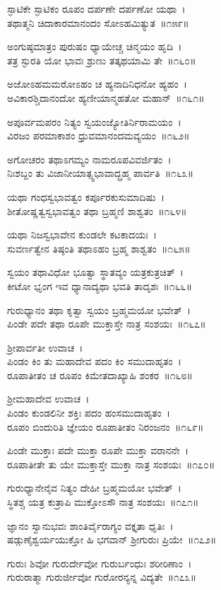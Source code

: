 ಸ್ಫಾಟಿಕೇ ಸ್ಫಾಟಿಕಂ ರೂಪಂ ದರ್ಪಣೇ ದರ್ಪಣೋ ಯಥಾ~।\\
ತಥಾತ್ಮನಿ ಚಿದಾಕಾರಮಾನಂದಂ ಸೋಽಹಮಿತ್ಯುತ~॥೧೫೯॥

ಅಂಗುಷ್ಠಮಾತ್ರಂ ಪುರುಷಂ ಧ್ಯಾಯೇಚ್ಚ ಚಿನ್ಮಯಂ ಹೃದಿ~।\\
ತತ್ರ ಸ್ಫುರತಿ ಯೋ ಭಾವಃ ಶ್ರುಣು ತತ್ಕಥಯಾಮಿ ತೇ~॥೧೬೦॥

ಅಜೋಽಹಮಮರೋಽಹಂ ಚ ಹ್ಯನಾದಿನಿಧನೋ ಹ್ಯಹಂ~।\\
ಅವಿಕಾರಶ್ಚಿದಾನಂದೋ ಹ್ಯಣೀಯಾನ್ಮಹತೋ ಮಹಾನ್~॥೧೬೧॥

ಅಪೂರ್ವಮಪರಂ ನಿತ್ಯಂ ಸ್ವಯಂಜ್ಯೋತಿರ್ನಿರಾಮಯಂ~।\\
ವಿರಜಂ ಪರಮಾಕಾಶಂ ಧ್ರುವಮಾನಂದಮವ್ಯಯಂ~॥೧೬೨॥

ಅಗೋಚರಂ ತಥಾಽಗಮ್ಯಂ ನಾಮರೂಪವಿವರ್ಜಿತಂ~।\\
ನಿಃಶಬ್ದಂ ತು ವಿಜಾನೀಯಾತ್ಸ್ವಭಾವಾದ್ಬ್ರಹ್ಮ ಪಾರ್ವತಿ~॥೧೬೩॥

ಯಥಾ ಗಂಧಸ್ವಭಾವತ್ವಂ ಕರ್ಪೂರಕುಸುಮಾದಿಷು~।\\
ಶೀತೋಷ್ಣತ್ವಸ್ವಭಾವತ್ವಂ ತಥಾ ಬ್ರಹ್ಮಣಿ ಶಾಶ್ವತಂ~॥೧೬೪॥

ಯಥಾ ನಿಜಸ್ವಭಾವೇನ ಕುಂಡಲೇ ಕಟಕಾದಯಃ~।\\
ಸುವರ್ಣತ್ವೇನ ತಿಷ್ಠಂತಿ ತಥಾಽಹಂ ಬ್ರಹ್ಮ ಶಾಶ್ವತಂ~॥೧೬೫॥

ಸ್ವಯಂ ತಥಾವಿಧೋ ಭೂತ್ವಾ ಸ್ಥಾತವ್ಯಂ ಯತ್ರಕುತ್ರಚಿತ್~।\\
ಕೀಟೋ ಭೃಂಗ ಇವ ಧ್ಯಾನಾದ್ಯಥಾ ಭವತಿ ತಾದೃಶಃ~॥೧೬೬॥

ಗುರುಧ್ಯಾನಂ ತಥಾ ಕೃತ್ವಾ ಸ್ವಯಂ ಬ್ರಹ್ಮಮಯೋ ಭವೇತ್~।\\
ಪಿಂಡೇ ಪದೇ ತಥಾ ರೂಪೇ ಮುಕ್ತಾಸ್ತೇ ನಾತ್ರ ಸಂಶಯಃ~॥೧೬೭॥

ಶ್ರೀಪಾರ್ವತೀ ಉವಾಚ~।\\
ಪಿಂಡಂ ಕಿಂ ತು ಮಹಾದೇವ ಪದಂ ಕಿಂ ಸಮುದಾಹೃತಂ~।\\
ರೂಪಾತೀತಂ ಚ ರೂಪಂ ಕಿಮೇತದಾಖ್ಯಾಹಿ ಶಂಕರ~॥೧೬೮॥

ಶ್ರೀಮಹಾದೇವ ಉವಾಚ~।\\
ಪಿಂಡಂ ಕುಂಡಲಿನೀ ಶಕ್ತಿಃ ಪದಂ ಹಂಸಮುದಾಹೃತಂ~।\\
ರೂಪಂ ಬಿಂದುರಿತಿ ಜ್ಞೇಯಂ ರೂಪಾತೀತಂ ನಿರಂಜನಂ~॥೧೬೯॥

ಪಿಂಡೇ ಮುಕ್ತಾಃ ಪದೇ ಮುಕ್ತಾ ರೂಪೇ ಮುಕ್ತಾ ವರಾನನೇ~।\\
ರೂಪಾತೀತೇ ತು ಯೇ ಮುಕ್ತಾಸ್ತೇ ಮುಕ್ತಾ ನಾತ್ರ ಸಂಶಯಃ~॥೧೭೦॥

ಗುರುಧ್ಯಾನೇನೈವ ನಿತ್ಯಂ ದೇಹೀ ಬ್ರಹ್ಮಮಯೋ ಭವೇತ್~।\\
ಸ್ಥಿತಶ್ಚ ಯತ್ರ ಕುತ್ರಾಪಿ ಮುಕ್ತೋಽಸೌ ನಾತ್ರ ಸಂಶಯಃ~॥೧೭೧॥

ಜ್ಞಾನಂ ಸ್ವಾನುಭವಃ ಶಾಂತಿರ್ವೈರಾಗ್ಯಂ ವಕ್ತೃತಾ ಧೃತಿಃ~।\\
ಷಡ್ಗುಣೈಶ್ವರ್ಯಯುಕ್ತೋ ಹಿ ಭಗವಾನ್ ಶ್ರೀಗುರುಃ ಪ್ರಿಯೇ~॥೧೭೨॥

ಗುರುಃ ಶಿವೋ ಗುರುರ್ದೇವೋ ಗುರುರ್ಬಂಧುಃ ಶರೀರಿಣಾಂ~।\\
ಗುರುರಾತ್ಮಾ ಗುರುರ್ಜೀವೋ ಗುರೋರನ್ಯನ್ನ ವಿದ್ಯತೇ~॥೧೭೩॥

